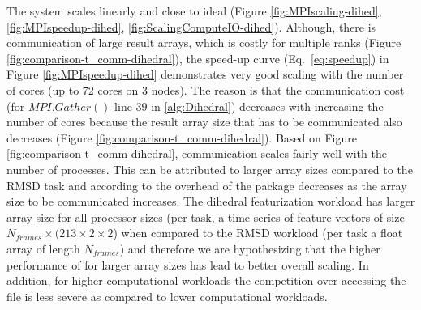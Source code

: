 The system scales linearly and close to ideal (Figure \ref{fig:MPIscaling-dihed}, \ref{fig:MPIspeedup-dihed}, \ref{fig:ScalingComputeIO-dihed}). Although, there is communication of large
result arrays, which is costly for multiple ranks (Figure \ref{fig:comparison-t_comm-dihedral}), the speed-up curve (Eq.~\ref{eq:speedup}) in Figure \ref{fig:MPIspeedup-dihed}
demonstrates very good scaling with the number of cores (up to 72 cores on 3 nodes).  The reason is that the communication cost (for
$MPI.Gather()$-line 39 in \ref{alg:Dihedral}) decreases with increasing the number of cores because the result array size that has to be
communicated also decreases (Figure \ref{fig:comparison-t_comm-dihedral}).  Based on Figure \ref{fig:comparison-t_comm-dihedral}, communication scales fairly well
with the number of processes. This can be attributed to larger array sizes compared to the RMSD task and according to \cite{Dalcin:2011aa}
the overhead of the  package decreases as the array size to be communicated increases. The dihedral featurization workload
has larger array size for all processor sizes (per task, a time series of feature vectors of size $N_{frames} \times (213 \times 2 \times 2$) when
compared to the RMSD workload (per task a float array of length $N_{frames}$) and therefore we are hypothesizing that the higher
performance of  for larger array sizes has lead to better overall scaling. 
In addition, for higher computational workloads the competition over accessing the file is less severe as compared to lower computational workloads. 
 

